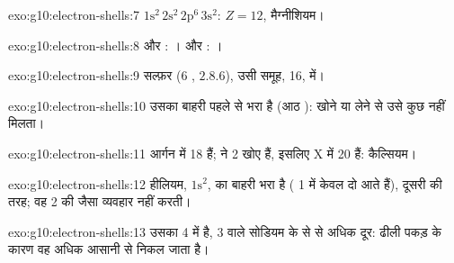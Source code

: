 \begin{solution}{exo:g10:electron-shells:7}
$1\mathrm{s}^2\,2\mathrm{s}^2\,2\mathrm{p}^6\,3\mathrm{s}^2$: $Z = 12$,
मैग्नीशियम।
\end{solution}

\begin{solution}{exo:g10:electron-shells:8}
 और : ।  और :
।
\end{solution}

\begin{solution}{exo:g10:electron-shells:9}
सल्फ़र (6 , $2.8.6$), उसी समूह, 16, में।
\end{solution}

\begin{solution}{exo:g10:electron-shells:10}
उसका बाहरी  पहले से भरा है (आठ ):  खोने या लेने से उसे
कुछ नहीं मिलता।
\end{solution}

\begin{solution}{exo:g10:electron-shells:11}
आर्गन में 18  हैं;  ने 2 खोए हैं, इसलिए X में 20 हैं: कैल्सियम।
\end{solution}

\begin{solution}{exo:g10:electron-shells:12}
हीलियम, $1\mathrm{s}^2$, का बाहरी  भरा है ( 1 में केवल दो
 आते हैं), दूसरी  की तरह; वह  2 की  जैसा
व्यवहार नहीं करती।
\end{solution}

\begin{solution}{exo:g10:electron-shells:13}
उसका   4 में है,  3 वाले सोडियम के  से 
से अधिक दूर: ढीली पकड़ के कारण वह अधिक आसानी से निकल जाता है।
\end{solution}

